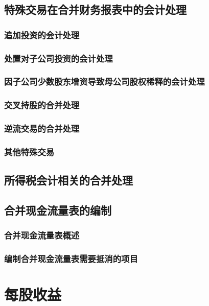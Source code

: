 \documentclass[UTF8,12pt]{ctexart}
\numberwithin{equation}{section} %
\numberwithin{figure}{section}
\numberwithin{table}{section}
\begin{document}
	\subsection{特殊交易在合并财务报表中的会计处理}
	\subsubsection{追加投资的会计处理}
	\subsubsection{处置对子公司投资的会计处理}
	\subsubsection{因子公司少数股东增资导致母公司股权稀释的会计处理}
	\subsubsection{交叉持股的合并处理}
	\subsubsection{逆流交易的合并处理}
	\subsubsection{其他特殊交易}
	
	\subsection{所得税会计相关的合并处理}
	
	\subsection{合并现金流量表的编制}
	\subsubsection{合并现金流量表概述}
	
	\subsubsection{编制合并现金流量表需要抵消的项目}
	
	\newpage
	
	\section{每股收益}
\end{document}

